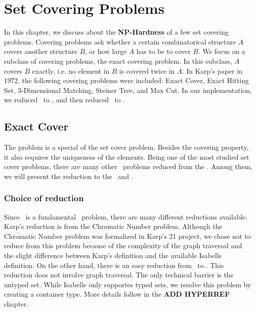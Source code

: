 \newcommand{\bigO}[1]{$\mathcal{O}({#1})$}

\chapter{Set Covering Problems}\label{chapter:covering}
In this chapter, we discuss about the \textbf{NP-Hardness} of a few set covering problems. Covering problems ask whether a certain combinatorical structure $A$ covers another structure $B$, or how large $A$ has to be to cover $B$. We focus on a subclass of covering problems, the exact covering problem. In this subclass, $A$ covers $B$ exactly, i.e. no element in $B$ is covered twice in $A$. In Karp's paper in 1972, the following covering problems were included: Exact Cover, Exact Hitting Set, 3-Dimensional Matching, Steiner Tree, and Max Cut. In our implementation, we reduced \SAT\ to \XC, and then reduced \XC\ to \HS. 

\section{Exact Cover}
The \XC problem is a special of the set cover problem. Besides the covering property, it also requires the uniqueness of the elements.
Being one of the most studied set cover problems, there are many other \NPH\ problems reduced from the \XC. Among them, we will present 
the reduction to the \SS\ and \HS. 

\subsection{Choice of reduction}
Since \XC\ is a fundamental \NPH\ problem, there are many different reductions available. 
Karp's reduction is from the Chromatic Number problem. 
Although the Chromatic Number problem was formalized in Karp's 21 project, we chose not to reduce from this problem 
because of the complexity of the graph traversal and the slight difference between Karp's definition and the available Isabelle definition. 
On the other hand, there is an easy reduction from \SAT\ to \XC. This reduction does not involve graph traversal.
The only technical barrier is the untyped set. While Isabelle only supportes typed sets, we resolve this problem
by creating a container type. More details follow in the \textbf{ADD HYPERREF} chapter. 


